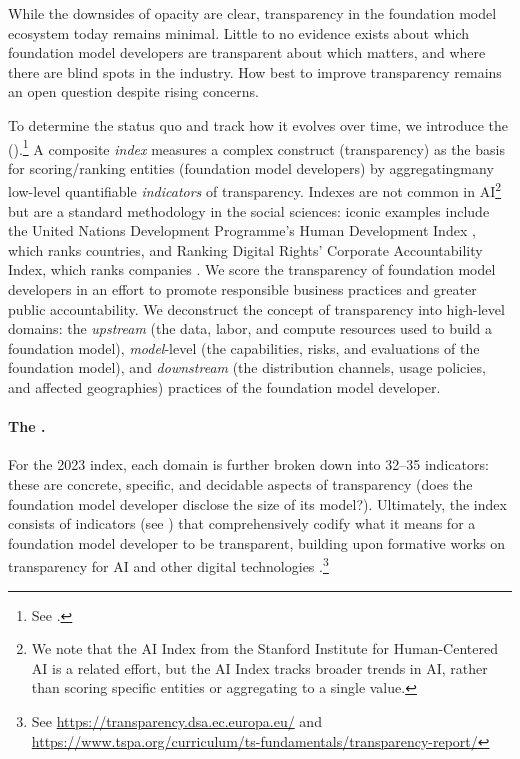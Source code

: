 \documentclass[screen, authorversion, acmsmall]{acmart}
\begin{document}
While the downsides of opacity are clear, transparency in the foundation model ecosystem today remains minimal.
Little to no evidence exists about which foundation model developers are transparent about which matters, and where there are blind spots in the industry.
How best to improve transparency remains an open question despite rising concerns.


To determine the status quo and track how it evolves over time, we introduce the \projectname (\projectabbreviation).\footnote{See \indexUrl.}
A composite \textit{index} measures a complex construct (\eg transparency) as the basis for scoring/ranking entities (\eg foundation model developers) by aggregatingmany low-level quantifiable \textit{indicators} of transparency.
Indexes are not common in AI\footnote{We note that the AI Index from the Stanford Institute for Human-Centered AI \citep{zhang2022ai, maslej2023ai} is a related effort, but the AI Index tracks broader trends in AI, rather than scoring specific entities or aggregating to a single value.} but are a standard methodology in the social sciences: iconic examples include the United Nations Development Programme's Human Development Index \citep{undp2022hdr}, which ranks countries, and Ranking Digital Rights' Corporate Accountability Index, which ranks companies \citep{rdr2020index}.
We score the transparency of foundation model developers in an effort to promote responsible business practices and greater public accountability. 
We deconstruct the concept of transparency into \numdomains high-level domains: the \textit{upstream} (\eg the data, labor, and compute resources used to build a foundation model), \textit{model}-level (\eg the capabilities, risks, and evaluations of the foundation model), and \textit{downstream} (\eg the distribution channels, usage policies, and affected geographies) practices of the foundation model developer.

\paragraph{The \projectversionedname.}
For the 2023 index, each domain is further broken down into 32--35 indicators: these are concrete, specific, and decidable aspects of transparency (\eg does the foundation model developer disclose the size of its model?). 
Ultimately, the index consists of \numindicators indicators (see ) that comprehensively codify what it means for a foundation model developer to be transparent, building upon formative works on transparency for AI and other digital technologies \citep{gebru2021datasheets, bender2018data, mitchell2018modelcards, raji2019actionable, gray2019ghost, crawford2021atlas, cdt2021, keller2022platform}.\footnote{See \url{https://transparency.dsa.ec.europa.eu/} and \url{https://www.tspa.org/curriculum/ts-fundamentals/transparency-report/}} 
\end{document}
